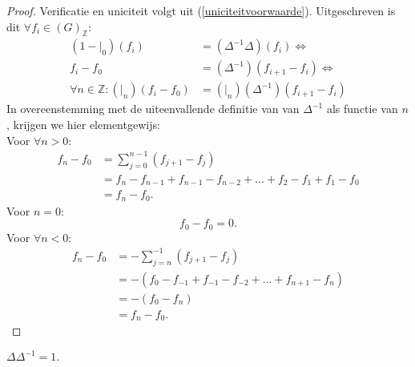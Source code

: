 \documentclass[a4paper,12pt]{article}
\begin{document}
\begin{proof}
    Verificatie en uniciteit volgt uit (\ref{uniciteitvoorwaarde}).
    Uitgeschreven is dit $\forall f_i \in (G)_{\mathbb{Z}}:$
    \begin{align*}
        (1 -|_0) (f_i)                             & =(\Delta^{-1} \Delta)(f_i) \Leftrightarrow      \\
        f_i - f_0                                  & = (\Delta^{-1})(f_{i+1} - f_i ) \Leftrightarrow \\
        \forall n \in \mathbb{Z}: (|_n)(f_i - f_0) & = (|_n)(\Delta^{-1})(f_{i+1} - f_i )
    \end{align*}
    In overeenstemming met de uiteenvallende definitie van van $\Delta^{-1}$ als functie van $n$, krijgen we hier elementgewijs:\\
    Voor $\forall n>0:$
    \begin{align*}
        f_n - f_0 & =\sum_{j=0}^{n-1}{(f_{j+1} - f_j)}                              \\
                  & = f_{n} -f_{n-1}+f_{n-1}-f_{n-2}+...+f_{2} -f_{1}+ f_{1} -f_{0} \\
                  & = f_n - f_0.
    \end{align*}
    Voor $n=0:$
    $$ f_0 - f_0 = 0.$$
    Voor $\forall n<0:$
    \begin{align*}
        f_n - f_0 & =-\sum_{j=n}^{-1}{(f_{j+1} - f_j)}                          \\
                  & = -(f_0 - f_{-1} + f_{-1} - f_{-2} + ... + f_{n+1} - f_{n}) \\
                  & = -(f_0 - f_{n})                                            \\
                  & = f_n - f_0.
    \end{align*}
\end{proof}



\begin{lemma}
    $
        \Delta \Delta^{-1} = 1.
    $
\end{lemma}
\end{document}
